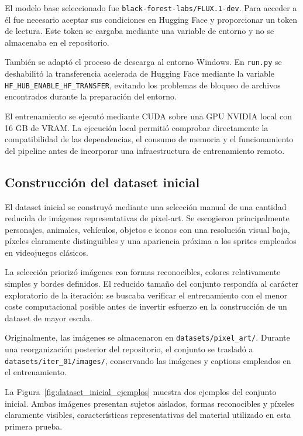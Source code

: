 \documentclass[a4paper,11pt,titlepage]{scrbook}
\begin{document}
El modelo base seleccionado fue \texttt{black-forest-labs/FLUX.1-dev}. Para acceder a él fue necesario aceptar sus condiciones en Hugging Face y proporcionar un token de lectura. Este token se cargaba mediante una variable de entorno y no se almacenaba en el repositorio.

\medskip

También se adaptó el proceso de descarga al entorno Windows. En \texttt{run.py} se deshabilitó la transferencia acelerada de Hugging Face mediante la variable \texttt{HF\_HUB\_ENABLE\_HF\_TRANSFER}, evitando los problemas de bloqueo de archivos encontrados durante la preparación del entorno.

\medskip

El entrenamiento se ejecutó mediante CUDA sobre una GPU NVIDIA local con 16 GB de VRAM. La ejecución local permitió comprobar directamente la compatibilidad de las dependencias, el consumo de memoria y el funcionamiento del pipeline antes de incorporar una infraestructura de entrenamiento remoto.

\subsection{Construcción del dataset inicial}
\label{subsec:dataset_iteracion_1}

El dataset inicial se construyó mediante una selección manual de una cantidad reducida de imágenes representativas de pixel-art. Se escogieron principalmente personajes, animales, vehículos, objetos e iconos con una resolución visual baja, píxeles claramente distinguibles y una apariencia próxima a los sprites empleados en videojuegos clásicos.

\medskip

La selección priorizó imágenes con formas reconocibles, colores relativamente simples y bordes definidos. El reducido tamaño del conjunto respondía al carácter exploratorio de la iteración: se buscaba verificar el entrenamiento con el menor coste computacional posible antes de invertir esfuerzo en la construcción de un dataset de mayor escala.

\medskip

Originalmente, las imágenes se almacenaron en \texttt{datasets/pixel\_art/}. Durante una reorganización posterior del repositorio, el conjunto se trasladó a \texttt{datasets/iter\_01/images/}, conservando las imágenes y captions empleados en el entrenamiento.

\medskip

La Figura~\ref{fig:dataset_inicial_ejemplos} muestra dos ejemplos del conjunto inicial. Ambas imágenes presentan sujetos aislados, formas reconocibles y píxeles claramente visibles, características representativas del material utilizado en esta primera prueba.
\end{document}
